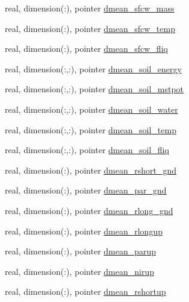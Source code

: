 \begin{DoxyCompactItemize}
\item 
real, dimension(\+:), pointer \hyperlink{structed__state__vars_1_1edtype_a9578c5b252d80b9f989b3f5fda2a640c}{dmean\+\_\+sfcw\+\_\+mass}
\item 
real, dimension(\+:), pointer \hyperlink{structed__state__vars_1_1edtype_aca003f1ff6d119038e1b2f35c2788059}{dmean\+\_\+sfcw\+\_\+temp}
\item 
real, dimension(\+:), pointer \hyperlink{structed__state__vars_1_1edtype_ace74ec5fa4a910aba74414c6a3729160}{dmean\+\_\+sfcw\+\_\+fliq}
\item 
real, dimension(\+:,\+:), pointer \hyperlink{structed__state__vars_1_1edtype_a596c140b01c1ad5de8675f4fc9f8b5a1}{dmean\+\_\+soil\+\_\+energy}
\item 
real, dimension(\+:,\+:), pointer \hyperlink{structed__state__vars_1_1edtype_a48f03f6d1fc77e40ff809bfd05f6428b}{dmean\+\_\+soil\+\_\+mstpot}
\item 
real, dimension(\+:,\+:), pointer \hyperlink{structed__state__vars_1_1edtype_abf11376001b593e66956152738e42e14}{dmean\+\_\+soil\+\_\+water}
\item 
real, dimension(\+:,\+:), pointer \hyperlink{structed__state__vars_1_1edtype_a36baae3ff2279f679a096575559da485}{dmean\+\_\+soil\+\_\+temp}
\item 
real, dimension(\+:,\+:), pointer \hyperlink{structed__state__vars_1_1edtype_ad28ce13901a2f7b8b2a70f1cc869ebb8}{dmean\+\_\+soil\+\_\+fliq}
\item 
real, dimension(\+:), pointer \hyperlink{structed__state__vars_1_1edtype_a869ffd8092ba148bb2d16c638ac6e98d}{dmean\+\_\+rshort\+\_\+gnd}
\item 
real, dimension(\+:), pointer \hyperlink{structed__state__vars_1_1edtype_a5c6dbbdd9dd21f187c425166af83d2b8}{dmean\+\_\+par\+\_\+gnd}
\item 
real, dimension(\+:), pointer \hyperlink{structed__state__vars_1_1edtype_aed272e87c8d065837f29259c535e1a4c}{dmean\+\_\+rlong\+\_\+gnd}
\item 
real, dimension(\+:), pointer \hyperlink{structed__state__vars_1_1edtype_a91f09c8601848d263d853bf96bcf12dd}{dmean\+\_\+rlongup}
\item 
real, dimension(\+:), pointer \hyperlink{structed__state__vars_1_1edtype_ad1faf4f7d79892a41973a271897ca3cf}{dmean\+\_\+parup}
\item 
real, dimension(\+:), pointer \hyperlink{structed__state__vars_1_1edtype_ae25652832b1b67c0c2df898d6e6923e7}{dmean\+\_\+nirup}
\item 
real, dimension(\+:), pointer \hyperlink{structed__state__vars_1_1edtype_abb49695508afa06566365e5a9f388036}{dmean\+\_\+rshortup}

\end{DoxyCompactItemize}
